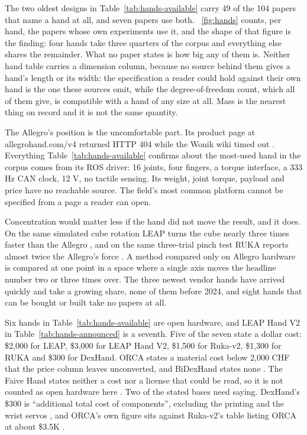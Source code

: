 The two oldest designs in Table~\ref{tab:hands-available} carry 49 of the 104 papers that name a
hand at all, and seven papers use both. \figurename~\ref{fig:hands} counts, per hand, the papers
whose own experiments use it, and the shape of that figure is the finding: four hands take three
quarters of the corpus and everything else shares the remainder. What no paper states is how big
any of them is. Neither hand table carries a
dimension column, because no source behind them gives a hand's length or its width: the
specification a reader could hold against their own hand is the one these sources omit, while
the degree-of-freedom count, which all of them give, is compatible with a hand of any size at
all. Mass is the nearest thing on record and it is not the same quantity.

The Allegro's position is the uncomfortable part. Its product page at allegrohand.com/v4 returned
HTTP 404 while the Wonik wiki timed out \cite{allegro_hand_v4_2016}. Everything
Table~\ref{tab:hands-available} confirms about the most-used hand in the corpus comes from its ROS
driver: 16 joints, four fingers, a torque interface, a 333 Hz CAN clock, 12 V, no tactile sensing.
Its weight, joint torque, payload and price have no reachable source. The field's most common
platform cannot be specified from a page a reader can open.

Concentration would matter less if the hand did not move the result, and it does. On the same
simulated cube rotation LEAP turns the cube nearly three times faster than the Allegro
\cite{leap_hand_2023}, and on the same three-trial pinch test RUKA reports almost twice the
Allegro's force \cite{ruka_2025}. A method compared only on Allegro hardware is compared at one
point in a space where a single axis moves the headline number two or three times over. The three
newest vendor hands have arrived quickly and take a growing share, none of them before 2024, and
eight hands that can be bought or built take no papers at all.

\label{sec:hands:open}
Six hands in Table~\ref{tab:hands-available} are open hardware, and LEAP Hand V2 in
Table~\ref{tab:hands-announced} is a seventh. Five of the seven state a dollar cost: \$2,000 for
LEAP, \$3,000 for LEAP Hand V2, \$1,500 for Ruka-v2, \$1,300 for RUKA and \$300 for DexHand. ORCA
states a material cost below 2,000 CHF that the price column leaves unconverted, and BiDexHand
states none \cite{orca_hand_2025,bidexhand_2025}. The Faive Hand states neither a cost nor a
license that could be read, so it is not counted as open hardware here \cite{faive_hand_2023}. Two
of the stated bases need saying. DexHand's \$300 is ``additional total cost of components'',
excluding the printing and the wrist servos \cite{dexhand_open_source_2023}, and ORCA's own figure
sits against Ruka-v2's table listing ORCA at about \$3.5K \cite{ruka_v2_2026}.

